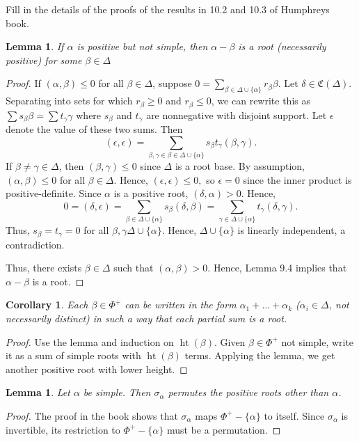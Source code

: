 \documentclass{article}
\DeclareMathOperator{\ht}{ht}
\newcommand{\mf}{\mathfrak}
\newtheorem{lem}[thm]{Lemma}
\newtheorem{cor}[thm]{Corollary}
\begin{document}
\p Fill in the details of the proofs of the results in 10.2 and 10.3 of Humphreys book.

\begin{lem} If $\alpha$ is positive but not simple, then $\alpha - \beta$ is a root 
(necessarily positive) for some $\beta \in \Delta$
\end{lem}
\begin{proof}
If $(\alpha, \beta) \le 0$ for all $\beta \in \Delta$, suppose
$0 = \sum_{\beta \in \Delta \cup \{ \alpha \}} r_\beta \beta$. Let $\delta \in \mf{C}(\Delta)$.
 Separating into sets for which $r_\beta \ge 0$ and $r_\beta \le 0$, we can rewrite this as
$\sum s_\beta \beta = \sum t_\gamma \gamma$ where $s_\beta$ and $t_\gamma$
are nonnegative with disjoint support.  Let $\epsilon$ denote the value
of these two sums.  Then
$$(\epsilon, \epsilon) = \sum_{\beta, \gamma \in \beta \in \Delta \cup \{ \alpha \}} s_\beta t_\gamma (\beta, \gamma).$$
If $\beta \neq \gamma \in \Delta$, then $(\beta, \gamma) \le 0$ since $\Delta$ is a root base. By assumption,
$(\alpha, \beta) \le 0$ for all $\beta \in \Delta$.  Hence, 
$(\epsilon, \epsilon) \le 0,$
so $\epsilon = 0$ since the inner product is positive-definite.  
Since $\alpha$ is a positive root, $(\delta, \alpha) > 0$.  Hence,
$$0 = (\delta, \epsilon) = \sum_{\beta \in \Delta \cup \{ \alpha \}} s_\beta (\delta, \beta) = \sum_{\gamma \in \Delta \cup \{ \alpha \}} t_\gamma (\delta, \gamma).$$
Thus, $s_\beta = t_\gamma = 0$ for all $\beta, \gamma \Delta \cup \{ \alpha \}$.  Hence, $\Delta \cup \{ \alpha \}$ is linearly independent, a contradiction.

Thus, there exists $\beta \in \Delta$ such that $(\alpha, \beta) > 0$.  Hence, Lemma 9.4 implies that $\alpha - \beta$ is a root.
\end{proof}

\begin{cor} Each $\beta \in \Phi^+$ can be written in the form $\alpha_1 + \ldots + \alpha_k$ ($\alpha_i \in \Delta$, not
necessarily distinct) in such a way that each partial sum is a root.
\end{cor}
\begin{proof}
Use the lemma and induction on $\ht(\beta)$.  Given $\beta \in \Phi^+$ not simple, write it as a sum of simple roots with $\ht(\beta)$ terms.
Applying the lemma, we get another positive root with lower height.
\end{proof}

\begin{lem}  Let $\alpha$ be simple.  Then $\sigma_\alpha$ permutes the positive roots other than $\alpha$.
\end{lem}
\begin{proof}
The proof in the book shows that $\sigma_\alpha$ maps $\Phi^+ - \{\alpha\}$ to itself.  Since $\sigma_\alpha$ is invertible, its restriction to $\Phi^+ - \{\alpha\}$ must be a permutation.
\end{proof}
\end{document}
